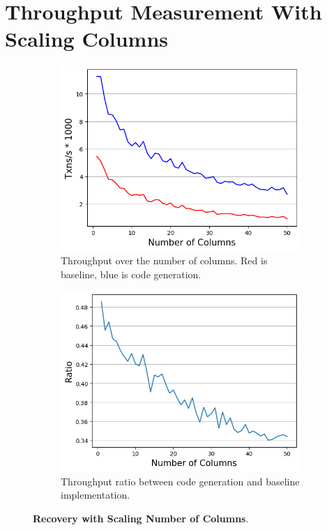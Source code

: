\documentclass[12pt]{cmuthesis}
\begin{document}
\section{Throughput Measurement With Scaling Columns}
\begin{figure}[ht!]
\centering
\begin{subfigure}{.44\textwidth}
 \centering
 \includegraphics[width=1.0\textwidth]{images/ColumnRecovery.png}
 \caption{Throughput over the number of columns. Red is baseline, blue is code generation.}
  \label{fig:col_recovery_throughput}
\end{subfigure}%
\begin{subfigure}{.45\textwidth}
 \centering
 \includegraphics[width=1.0\textwidth]{images/ColumnRecoveryRatio.png}
 \caption{Throughput ratio between code generation and baseline implementation.}
  \label{fig:col_recovery_ratio}
\end{subfigure}
\caption{\textbf{Recovery with Scaling Number of Columns}.}
\label{fig:col_recovery_throughput}
\end{figure}
\end{document}
